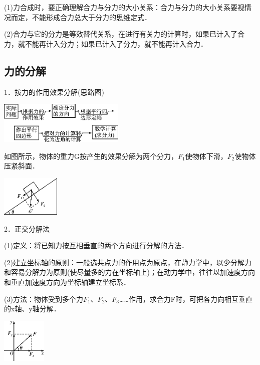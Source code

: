 (1)力合成时，要正确理解合力与分力的大小关系：合力与分力的大小关系要视情况而定，不能形成合力总大于分力的思维定式．

(2)合力与它的分力是等效替代关系，在进行有关力的计算时，如果已计入了合力，就不能再计入分力；如果已计入了分力，就不能再计入合力．
\newpage
\subsection{力的分解}

1．按力的作用效果分解(思路图)

\begin{center}\includegraphics[width=2.375in,height=0.79167in]{media/image70.png}\end{center}

如图所示，物体的重力G按产生的效果分解为两个分力，$F_1$使物体下滑，$F_2$使物体压紧斜面．

\begin{center}\includegraphics[width=1.10417in,height=0.76042in]{media/image71.png}\end{center}

2．正交分解法

(1)定义：将已知力按互相垂直的两个方向进行分解的方法．

(2)建立坐标轴的原则：一般选共点力的作用点为原点，在静力学中，以少分解力和容易分解力为原则(使尽量多的力在坐标轴上)；在动力学中，往往以加速度方向和垂直加速度方向为坐标轴建立坐标系．

(3)方法：物体受到多个力$F_1$、$F_2$、$F_3$\ldots\ldots 作用，求合力F时，可把各力向相互垂直的x轴、y轴分解．

\begin{center}\includegraphics[width=0.83333in,height=0.83333in]{media/image72.png}\end{center}

